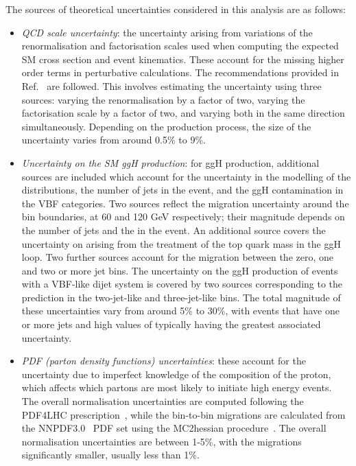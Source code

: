 The sources of theoretical uncertainties considered in this analysis are as follows:
\begin{itemize}
\item \textit{QCD scale uncertainty}: 
  the uncertainty arising from variations of the renormalisation and factorisation scales
  used when computing the expected SM cross section and event kinematics.
  These account for the missing higher order terms in perturbative calculations.
  The recommendations provided in Ref.~\cite{YR4} are followed.
  This involves estimating the uncertainty using three sources: 
  varying the renormalisation by a factor of two, varying the factorisation scale by a factor of two, 
  and varying both in the same direction simultaneously.
  Depending on the production process, the size of the uncertainty varies from around 0.5\% 
  to 9\%.
\item \textit{Uncertainty on the SM ggH production}: 
  for ggH production, 
  additional sources are included which account for the uncertainty in the modelling 
  of the \ptH distributions, the number of jets in the event, 
  and the ggH contamination in the VBF categories.
  Two sources reflect the migration uncertainty around the \ptH bin boundaries,
  at 60 and 120 GeV respectively; 
  their magnitude depends on the number of jets and the \ptH in the event.
  An additional source covers the uncertainty on \ptH 
  arising from the treatment of the top quark mass in the ggH loop.
  Two further sources account for the migration between the zero, one and two or more jet bins.
  The uncertainty on the ggH production of events with a VBF-like dijet system 
  is covered by two sources 
  corresponding to the prediction in the two-jet-like and three-jet-like bins.
  The total magnitude of these uncertainties vary from around 5\% to 30\%, 
  with events that have one or more jets and high values of \ptH 
  typically having the greatest associated uncertainty.
\item \textit{PDF (parton density functions) uncertainties}:
  these account for the uncertainty due to imperfect knowledge of the composition of the proton, 
  which affects which partons are most likely to initiate high energy events.
  The overall normalisation uncertainties are computed
  following the PDF4LHC
  prescription~\cite{PDF4LHC,YR3},
  while the bin-to-bin migrations are calculated from the
  NNPDF3.0~\cite{NNPDF3} PDF set
  using the {\sc MC2hessian} procedure~\cite{MC2Hessian}.
  The overall normalisation uncertainties are between 1-5\%, 
  with the migrations significantly smaller, usually less than 1\%.

\end{itemize}
